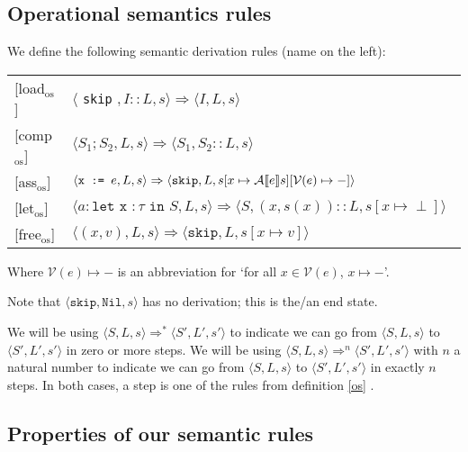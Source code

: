 \subsection{Operational semantics rules}
\begin{definition} 
\label{os}
We define the following semantic derivation rules (name on the left):

\begin{tabular}{p{5em}p{18em}p{13em}}
[load$_{\textrm{os}}$] &
\centering$\langle$ \texttt{skip} $, I::L, s \rangle \Rightarrow \langle I, L, s \rangle$ & \medskip\\

[comp$_{\textrm{os}}$] &
\centering$\langle S_1; S_2, L, s \rangle \Rightarrow \langle S_1, S_2::L, s \rangle$ & \medskip\\

[ass$_{\textrm{os}}$] &
\centering $\langle \texttt{x := } e, L, s \rangle \Rightarrow \langle \texttt{skip}, L, s[x \mapsto \mathcal{A} \llbracket e \rrbracket s][\mathcal{V}(e)\mapsto-] \rangle$ & \medskip\\

[let$_{\textrm{os}}$] &
\centering $\langle a : \texttt{let x } : \tau \texttt{ in } S, L, s \rangle \Rightarrow \langle S, (x,s(x))::L, s[x\mapsto \perp] \rangle$ & \medskip\\

[free$_{\textrm{os}}$] &
\centering$\langle (x,v), L, s \rangle \Rightarrow \langle \texttt{skip}, L, s[x\mapsto v] \rangle$ & \medskip\\
\end{tabular} 
Where $\mathcal{V}(e)\mapsto-$ is an abbreviation for `for all $x \in \mathcal{V}(e)$, $x \mapsto -$'.
\end{definition} 
Note that $\langle \texttt{skip}, \texttt{Nil}, s \rangle$ has no derivation; this is the/an end state. 

We will be using $\langle S, L, s \rangle \Rightarrow ^{*} \langle S', L', s' \rangle$ to indicate we can go from $\langle S, L, s \rangle$ to $\langle S', L', s' \rangle$ in zero or more steps. We will be using $\langle S, L, s \rangle \Rightarrow ^{n} \langle S', L', s' \rangle$ with $n$ a natural number to indicate we can go from $\langle S, L, s \rangle$ to $\langle S', L', s' \rangle$ in exactly $n$ steps. In both cases, a step is one of the rules from definition \ref{os} .


\subsection{Properties of our semantic rules}

